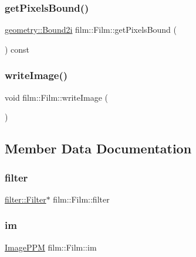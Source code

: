 \mbox{\label{classfilm_1_1Film_a2d97cfb2b1014f47fc9ba81f8daa46d4}} 
\subsubsection{\texorpdfstring{getPixelsBound()}{getPixelsBound()}}
{\footnotesize\ttfamily \mbox{\hyperlink{namespacegeometry_a918a919c0a947983a121b11e5c64934f}{geometry\+::\+Bound2i}} film\+::\+Film\+::get\+Pixels\+Bound (\begin{DoxyParamCaption}{ }\end{DoxyParamCaption}) const}

\mbox{\label{classfilm_1_1Film_a61527d407e6a30cfad0e61bd250c61ce}} 
\subsubsection{\texorpdfstring{writeImage()}{writeImage()}}
{\footnotesize\ttfamily void film\+::\+Film\+::write\+Image (\begin{DoxyParamCaption}{ }\end{DoxyParamCaption})}



\subsection{Member Data Documentation}
\mbox{\label{classfilm_1_1Film_a53fd3893ba73d6e88ba7d5f8a8dba890}} 
\subsubsection{\texorpdfstring{filter}{filter}}
{\footnotesize\ttfamily \mbox{\hyperlink{classfilter_1_1Filter}{filter\+::\+Filter}}$\ast$ film\+::\+Film\+::filter}

\mbox{\label{classfilm_1_1Film_ac076318872d910da8becb1eae0c511f6}} 
\subsubsection{\texorpdfstring{im}{im}}
{\footnotesize\ttfamily \mbox{\hyperlink{classImagePPM}{Image\+P\+PM}} film\+::\+Film\+::im}

